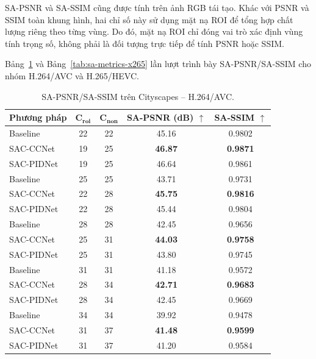 SA-PSNR và SA-SSIM cũng được tính trên ảnh RGB tái tạo. Khác với PSNR và SSIM toàn khung hình, hai chỉ số này sử dụng mặt nạ ROI để tổng hợp chất lượng riêng theo từng vùng. Do đó, mặt nạ ROI chỉ đóng vai trò xác định vùng tính trọng số, không phải là đối tượng trực tiếp để tính PSNR hoặc SSIM.

Bảng~\ref{tab:sa-metrics-x264} và Bảng~\ref{tab:sa-metrics-x265} lần lượt trình bày SA-PSNR/SA-SSIM cho nhóm H.264/AVC và H.265/HEVC.

\begin{table}[H]
\centering
\captionsetup{font=small}
\caption[SA-PSNR/SA-SSIM -- H.264/AVC]{SA-PSNR/SA-SSIM trên Cityscapes -- H.264/AVC.}
\label{tab:sa-metrics-x264}
\small
\begin{tabular}{lcccc}
\toprule
\textbf{Phương pháp} & $\boldsymbol{C_{roi}}$ & $\boldsymbol{C_{non}}$ & \textbf{SA-PSNR (dB)} $\uparrow$ & \textbf{SA-SSIM} $\uparrow$ \\
\midrule
Baseline & 22 & 22 & 45.16 & 0.9802 \\
SAC-CCNet & 19 & 25 & \textbf{46.87} & \textbf{0.9871} \\
SAC-PIDNet & 19 & 25 & 46.64 & 0.9861 \\
\midrule
Baseline & 25 & 25 & 43.71 & 0.9731 \\
SAC-CCNet & 22 & 28 & \textbf{45.75} & \textbf{0.9816} \\
SAC-PIDNet & 22 & 28 & 45.44 & 0.9804 \\
\midrule
Baseline & 28 & 28 & 42.45 & 0.9656 \\
SAC-CCNet & 25 & 31 & \textbf{44.03} & \textbf{0.9758} \\
SAC-PIDNet & 25 & 31 & 43.80 & 0.9745 \\
\midrule
Baseline & 31 & 31 & 41.18 & 0.9572 \\
SAC-CCNet & 28 & 34 & \textbf{42.71} & \textbf{0.9683} \\
SAC-PIDNet & 28 & 34 & 42.45 & 0.9669 \\
\midrule
Baseline & 34 & 34 & 39.92 & 0.9478 \\
SAC-CCNet & 31 & 37 & \textbf{41.48} & \textbf{0.9599} \\
SAC-PIDNet & 31 & 37 & 41.20 & 0.9584 \\
\bottomrule
\end{tabular}
\end{table}

